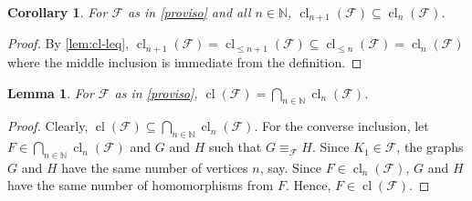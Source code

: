 \documentclass[11pt, DIV=15]{scrarticle}
\theoremstyle{definition}
\theoremstyle{plain}
\newtheorem{lemma}[definition]{Lemma}
\newtheorem{corollary}[definition]{Corollary}
\theoremstyle{remark}
\DeclareMathOperator{\cl}{cl}
\begin{document}
	\begin{corollary}
		For $\mathcal{F}$ as in \cref{proviso} and all $n \in \mathbb{N}$,
		$\cl_{n+1}(\mathcal{F}) \subseteq \cl_n(\mathcal{F})$.
	\end{corollary}
	\begin{proof}
		By \cref{lem:cl-leq},
		$\cl_{n+1}(\mathcal{F}) = \cl_{\leq n+1}(\mathcal{F}) \subseteq \cl_{\leq n}(\mathcal{F}) = \cl_n(\mathcal{F})$
		where the middle inclusion is immediate from the definition.
	\end{proof}
	
	
	\begin{lemma}
		For $\mathcal{F}$ as in \cref{proviso},
		$\cl(\mathcal{F}) = \bigcap_{n \in \mathbb{N}} \cl_n(\mathcal{F})$. 
	\end{lemma}
	\begin{proof}
		Clearly, $\cl(\mathcal{F}) \subseteq \bigcap_{n \in \mathbb{N}} \cl_n(\mathcal{F})$.
		For the converse inclusion,
		let $F \in \bigcap_{n \in \mathbb{N}} \cl_n(\mathcal{F})$ and $G$ and $H$ such that $G \equiv_{\mathcal{F}} H$.
		Since $K_1 \in \mathcal{F}$,
		the graphs $G$ and $H$ have the same number of vertices $n$, say.
		Since $F \in  \cl_n(\mathcal{F})$,
		$G$ and $H$ have the same number of homomorphisms from $F$.
		Hence, $F \in \cl(\mathcal{F})$. 
	\end{proof}
	
	
\end{document}

